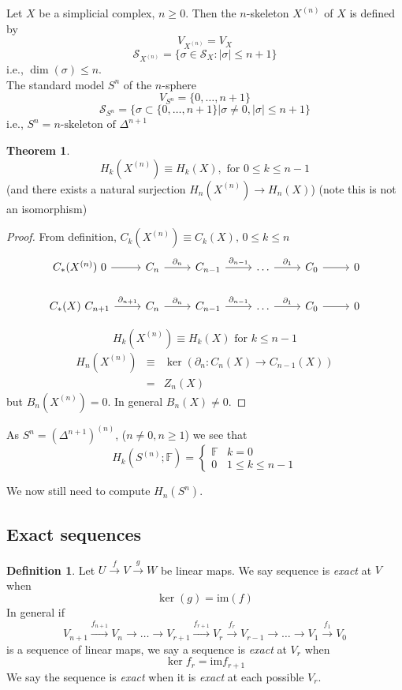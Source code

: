 \documentclass[a4paper,14pt]{extarticle}
\theoremstyle{definition}
\newtheorem*{theorem}{Theorem}
\newtheorem*{definition}{Definition}
\begin{document}
Let $X$ be a simplicial complex, $n\geq0$. Then the $n$-skeleton $X^{(n)}$ of $X$ is defined by 
\[V_{X^{(n)}}=V_X\] \[\mathcal{S}_{X^{(n)}}=\{\sigma\in\mathcal{S}_X:|\sigma|\leq n+1\}\]
i.e., $\dim(\sigma)\leq n$. \\

The standard model $S^n$ of the $n$-sphere
\[V_{S^n}=\{0,\ldots,n+1\}\] \[\mathcal{S}_{S^n}=
\{\sigma\subset\{0,\ldots,n+1\}|\sigma\neq0, |\sigma|\leq n+1\}\]
i.e., $S^n=\text{$n$-skeleton of } \Delta^{n+1}$

\begin{theorem}
	\[H_k(X^{(n)})\equiv H_k(X),\text{ for }0\leq k\leq n-1\] (and there exists a natural surjection
	$H_n(X^{(n)})\rightarrow H_n(X)$) (note this is not an isomorphism)
\end{theorem}

\begin{proof}
	From definition, $C_k(X^{(n)})\equiv C_k(X), \,0\leq k\leq n$
	\[ \begin{tikzcd}
		C_*(X^{(n)})\,\,
		0 \arrow{r} & C_n \arrow{r}{\partial_n}  & C_{n-1} \arrow{r}{\partial_{n-1}} &
		\ldots \arrow{r}{\partial_1} & 
		C_0 \arrow{r} & 0  \\
		C_*(X)\,\,
		 C_{n+1} \arrow{r}{\partial_{n+1}} &
		C_n \arrow{r}{\partial_n} & C_{n-1} \arrow{r}{\partial_{n-1}} &
		\ldots \arrow{r}{\partial_1} & C_0 \arrow{r} & 0  
		\end{tikzcd}
	\]

	\[H_k(X^{(n)})\equiv H_k(X)\text{ for }k\leq n-1\]
	\begin{eqnarray*}
		H_n(X^{(n)})&\equiv&\ker(\partial_n:C_n(X)\rightarrow C_{n-1}(X)) \\
					&=&Z_n(X)
	\end{eqnarray*}
	 but $B_n(X^{(n)})=0$. In general $B_n(X)\neq 0$.
\end{proof}

As $S^n=(\Delta^{n+1})^{(n)}$, ($n\neq0, n\geq 1$) we see that 
\[H_k(S^{(n)};\mathbb{F})=\begin{cases}\mathbb{F} & k=0 \\ 0 & 1\leq k\leq n-1\end{cases}\]

We now still need to compute $H_n(S^n)$.

\subsection{Exact sequences}
\begin{definition}
	Let $U\xrightarrow{f} V\xrightarrow{g} W$ be linear maps. We say sequence is \emph{exact} at $V$ when
	\[\ker(g)=\text{im}(f)\] In general if 
	\[V_{n+1}\xrightarrow{f_{n+1}} V_n\rightarrow\ldots
	\rightarrow V_{r+1}\xrightarrow{f_{r+1}} V_r
	\xrightarrow{f_r} V_{r-1}\rightarrow\ldots
	\rightarrow V_1\xrightarrow{f_1}V_0\] is a sequence 
	of linear maps, we say a sequence is \emph{exact} at $V_r$ when \[\ker f_r=\text{im} f_{r+1}\] We say the sequence is \emph{exact} when it is 
	\emph{exact} at each possible $V_r$.
\end{definition}
\end{document}
